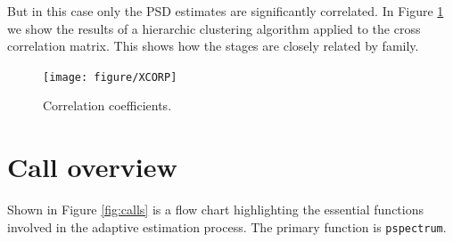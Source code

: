 \documentclass{article}\usepackage{graphicx, color}
\newenvironment{knitrout}{}{} %
\newcommand{\Rcmd}[1]{\texttt{#1}}
\begin{document}
But in this case only the PSD estimates are significantly correlated.
In Figure \ref{fig:histcorrel} we show the results of a hierarchic
clustering
algorithm applied to the cross correlation matrix.  This shows
how the stages are closely related by family.

\begin{figure}[htb!]
\begin{center}
\begin{knitrout}
\color{fgcolor}
\texttt{[image: figure/XCORP]} 

\end{knitrout}

\caption{Correlation coefficients.}
\label{fig:histcorrel}
\end{center}
\end{figure}

\section{Call overview}

Shown
in Figure \ref{fig:calls}
is a flow chart 
highlighting the essential
functions involved in the adaptive estimation
process. The primary function is \Rcmd{pspectrum}.
\end{document}
